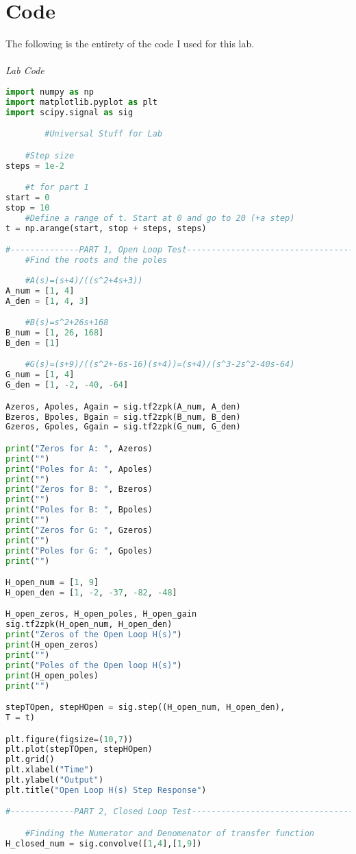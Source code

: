 \documentclass[12pt,a4paper]{article}
\begin{document}
\section{Code}
The following is the entirety of the code I used for this lab.\\
\\
\textit{Lab Code}
\begin{lstlisting}[language=Python]
import numpy as np
import matplotlib.pyplot as plt
import scipy.signal as sig

        #Universal Stuff for Lab

    #Step size
steps = 1e-2

    #t for part 1
start = 0
stop = 10
    #Define a range of t. Start at 0 and go to 20 (+a step)
t = np.arange(start, stop + steps, steps)

#--------------PART 1, Open Loop Test------------------------------------#
    #Find the roots and the poles
    
    #A(s)=(s+4)/((s^2+4s+3))
A_num = [1, 4]
A_den = [1, 4, 3]

    #B(s)=s^2+26s+168
B_num = [1, 26, 168]
B_den = [1]

    #G(s)=(s+9)/((s^2+-6s-16)(s+4))=(s+4)/(s^3-2s^2-40s-64)
G_num = [1, 4]
G_den = [1, -2, -40, -64]

Azeros, Apoles, Again = sig.tf2zpk(A_num, A_den)
Bzeros, Bpoles, Bgain = sig.tf2zpk(B_num, B_den)
Gzeros, Gpoles, Ggain = sig.tf2zpk(G_num, G_den)

print("Zeros for A: ", Azeros)
print("")
print("Poles for A: ", Apoles)
print("")
print("Zeros for B: ", Bzeros)
print("")
print("Poles for B: ", Bpoles)
print("")
print("Zeros for G: ", Gzeros)
print("")
print("Poles for G: ", Gpoles)
print("")

H_open_num = [1, 9]
H_open_den = [1, -2, -37, -82, -48]

H_open_zeros, H_open_poles, H_open_gain
sig.tf2zpk(H_open_num, H_open_den)
print("Zeros of the Open Loop H(s)")
print(H_open_zeros)
print("")
print("Poles of the Open loop H(s)")
print(H_open_poles)
print("")

stepTOpen, stepHOpen = sig.step((H_open_num, H_open_den), 
T = t)

plt.figure(figsize=(10,7))
plt.plot(stepTOpen, stepHOpen)
plt.grid()
plt.xlabel("Time")
plt.ylabel("Output")
plt.title("Open Loop H(s) Step Response")

#-------------PART 2, Closed Loop Test---------------------------------------#

    #Finding the Numerator and Denomenator of transfer function
H_closed_num = sig.convolve([1,4],[1,9])


\end{lstlisting}
\end{document}
